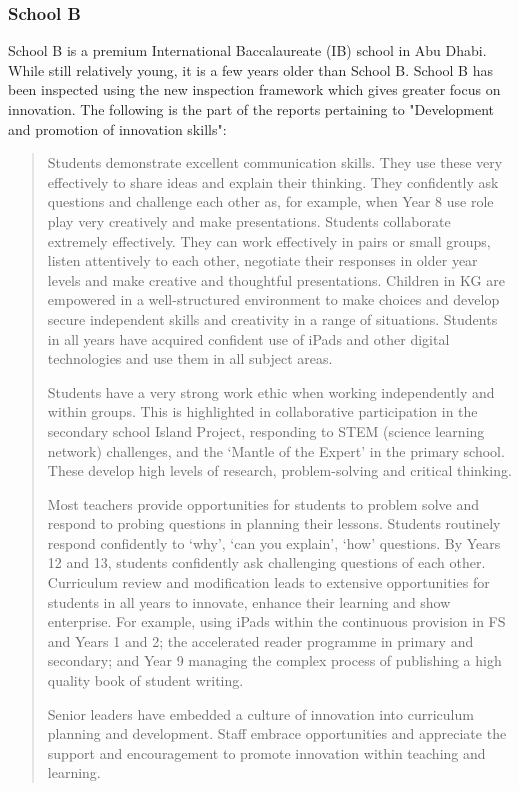 \subsubsection{School B}
School B is a premium International Baccalaureate (IB) school in Abu Dhabi. While still relatively young, it is a few years older than School B. School B has been inspected using the new inspection framework which gives greater focus on innovation. The following is the part of the reports pertaining to "Development and promotion of innovation skills":
\begin{quote}
Students demonstrate excellent communication skills. They use these very effectively to share ideas and explain their thinking. They confidently ask questions and challenge each other as, for example, when Year 8 use role play very creatively and make presentations. Students collaborate extremely effectively. They can work effectively in pairs or small groups, listen attentively to each other, negotiate their responses in older year levels and make creative and thoughtful presentations. Children in KG are empowered in a well-structured environment to make choices and develop secure independent skills and creativity in a range of situations. Students in all years have acquired confident use of iPads and other digital technologies and use them in all subject areas.

Students have a very strong work ethic when working independently and within groups. This is highlighted in collaborative participation in the secondary school Island Project, responding to STEM (science learning network) challenges, and the ‘Mantle of the Expert’ in the primary school. These develop high levels of research, problem-solving and critical thinking.

Most teachers provide opportunities for students to problem solve and respond to probing questions in planning their lessons. Students routinely respond confidently to ‘why’, ‘can you explain’, ‘how’ questions. By Years 12 and 13, students confidently ask challenging questions of each other.
Curriculum review and modification leads to extensive opportunities for students in all years to innovate, enhance their learning and show enterprise. For example, using iPads within the continuous provision in FS and Years 1 and 2; the accelerated reader programme in primary and secondary; and Year 9 managing the complex process of publishing a high quality book of student writing.

Senior leaders have embedded a culture of innovation into curriculum planning and development. Staff embrace opportunities and appreciate the support and encouragement to promote innovation within teaching and learning.
\end{quote}

